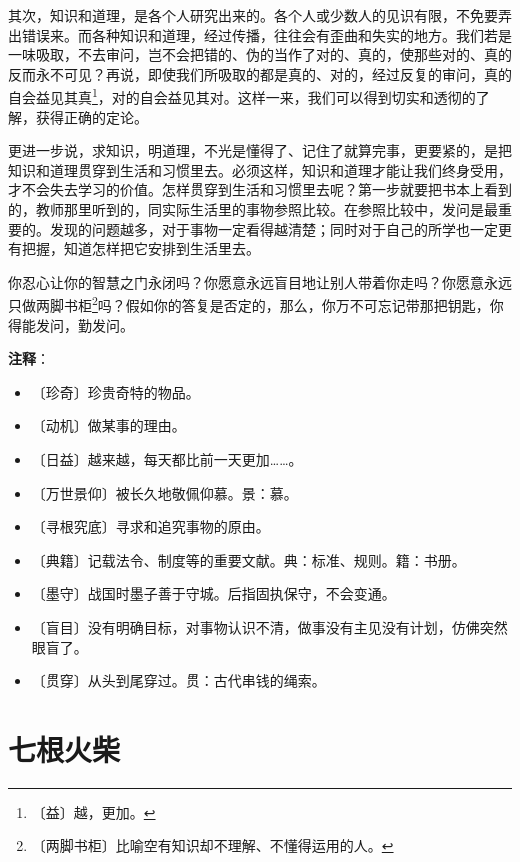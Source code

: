 \documentclass[12pt,UTF-8,openany]{ctexbook}
\begin{document}
\begin{normalsize}
    其次，知识和道理，是各个人研究出来的。各个人或少数人的见识有限，不免要弄出错误来。而各种知识和道理，经过传播，往往会有歪曲和失实的地方。我们若是一味吸取，不去审问，岂不会把错的、伪的当作了对的、真的，使那些对的、真的反而永不可见？再说，即使我们所吸取的都是真的、对的，经过反复的审问，真的自会益见其真\footnote{〔益〕越，更加。}，对的自会益见其对。这样一来，我们可以得到切实和透彻的了解，获得正确的定论。
    
    更进一步说，求知识，明道理，不光是懂得了、记住了就算完事，更要紧的，是把知识和道理贯穿到生活和习惯里去。必须这样，知识和道理才能让我们终身受用，才不会失去学习的价值。怎样贯穿到生活和习惯里去呢？第一步就要把书本上看到的，教师那里听到的，同实际生活里的事物参照比较。在参照比较中，发问是最重要的。发现的问题越多，对于事物一定看得越清楚；同时对于自己的所学也一定更有把握，知道怎样把它安排到生活里去。
    
    你忍心让你的智慧之门永闭吗？你愿意永远盲目地让别人带着你走吗？你愿意永远只做两脚书柜\footnote{〔两脚书柜〕比喻空有知识却不理解、不懂得运用的人。}吗？假如你的答复是否定的，那么，你万不可忘记带那把钥匙，你得能发问，勤发问。
    
\end{normalsize}


\newpage

\textbf{注释}：

\vspace{-1em}

\begin{itemize}
    \setlength\itemsep{-0.2em}
    \item 〔珍奇〕珍贵奇特的物品。
    \item 〔动机〕做某事的理由。
    \item 〔日益〕越来越，每天都比前一天更加……。
    \item 〔万世景仰〕被长久地敬佩仰慕。景：慕。
    \item 〔寻根究底〕寻求和追究事物的原由。
    \item 〔典籍〕记载法令、制度等的重要文献。典：标准、规则。籍：书册。
    \item 〔墨守〕战国时墨子善于守城。后指固执保守，不会变通。
    \item 〔盲目〕没有明确目标，对事物认识不清，做事没有主见没有计划，仿佛突然眼盲了。
    \item 〔贯穿〕从头到尾穿过。贯：古代串钱的绳索。
\end{itemize}

\chapter{七根火柴}
\end{document}

